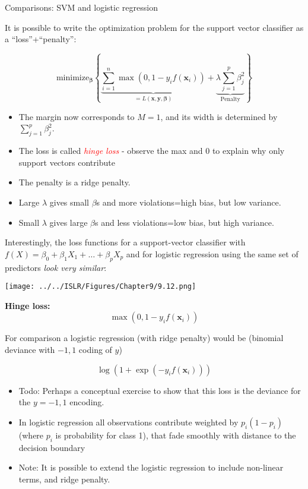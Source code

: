 \documentclass[10pt,ignorenonframetext,]{beamer}
\begin{document}
\begin{frame}{Comparisons: SVM and logistic regression}

It is possible to write the optimization problem for the support vector
classifier as a ``loss''+``penalty'':

\[\text{minimize}_{\boldsymbol \beta} \left\{ \underbrace{\sum_{i=1}^n \max(0,1-y_i f({\boldsymbol x}_i))}_{=L(\boldsymbol x, \boldsymbol{y},\boldsymbol\beta)}+ \underbrace{\lambda \sum_{j=1}^p \beta_j^2}_{\text{Penalty}} \right\}\]

\begin{itemize}
\item
  The margin now corresponds to \(M=1\), and its width is determined by
  \(\sum_{j=1}^p \beta_j^2\).
\item
  The loss is called \emph{\textcolor{red}{hinge loss}} - observe the
  max and 0 to explain why only support vectors contribute
\item
  The penalty is a ridge penalty.
\item
  Large \(\lambda\) gives small \(\beta\)s and more violations=high
  bias, but low variance.
\item
  Small \(\lambda\) gives large \(\beta\)s and less violations=low bias,
  but high variance.
\end{itemize}

\end{frame}

\begin{frame}

Interestingly, the loss functions for a support-vector classifier with
\(f(X)=\beta_0 + \beta_1X_1 +\ldots + \beta_pX_p\) and for logistic
regression using the same set of predictors \emph{look very similar}:
\vspace{-2mm}

\centering
\texttt{[image: ../../ISLR/Figures/Chapter9/9.12.png]}

\end{frame}

\begin{frame}

\textbf{Hinge loss:} \[\max(0,1-y_if({\boldsymbol x}_i))\]

For comparison a logistic regression (with ridge penalty) would be
(binomial deviance with \(-1,1\) coding of \(y\))

\[ \log(1+\exp(-y_i f({\boldsymbol x}_i)))\]

\begin{itemize}
\item
  Todo: Perhaps a conceptual exercise to show that this loss is the
  deviance for the \(y=-1,1\) encoding.
\item
  In logistic regression all observations contribute weighted by
  \(p_i(1-p_i)\) (where \(p_i\) is probability for class 1), that fade
  smoothly with distance to the decision boundary
\item
  Note: It is possible to extend the logistic regression to include
  non-linear terms, and ridge penalty.
\end{itemize}

\end{frame}
\end{document}
